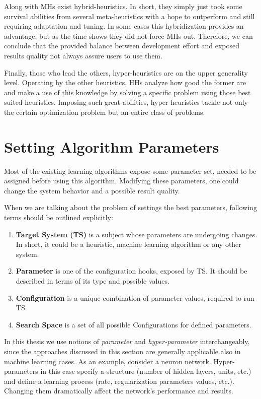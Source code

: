 Along with MHs exist hybrid-heuristics. In short, they simply just took some survival abilities from several meta-heuristics with a hope to outperform and still requiring adaptation and tuning. In some cases this hybridization provides an advantage, but as the time shows they did not force MHs out. Therefore, we can conclude that the provided balance between development effort and exposed results quality not always assure users to use them.

Finally, those who lead the others, hyper-heuristics are on the upper generality level. 
Operating by the other heuristics, HHs analyze how good the former are and make a use of this knowledge by solving a specific problem using those best suited heuristics. Imposing such great abilities, hyper-heuristics tackle not only the certain optimization problem but an entire class of problems.


\section{Setting Algorithm Parameters}\label{bg: section Parameters Setting}
Most of the existing learning algorithms expose some parameter set, needed to be assigned before using this algorithm. Modifying these parameters, one could change the system behavior and a possible result quality.

When we are talking about the problem of settings the best parameters, following terms should be outlined explicitly:
\begin{enumerate}
	\item \textbf{Target System (TS)} is a subject whose parameters are undergoing changes. In short, it could be a heuristic, machine learning algorithm or any other system.
	\item \textbf{Parameter} is one of the configuration hooks, exposed by TS. It should be described in terms of its type and possible values.
	\item \textbf{Configuration} is a unique combination of parameter values, required to run TS.
	\item \textbf{Search Space} is a set of all possible Configurations for defined parameters.
\end{enumerate}

In this thesis we use notions of \emph{parameter} and \emph{hyper-parameter} interchangeably, since the approaches discussed in this section are generally applicable also in machine learning cases. As an example, consider a neuron network. Hyper-parameters in this case specify a structure (number of hidden layers, units, etc.) and define a learning process (rate, regularization parameters values, etc.). Changing them dramatically affect the network's performance and results.

